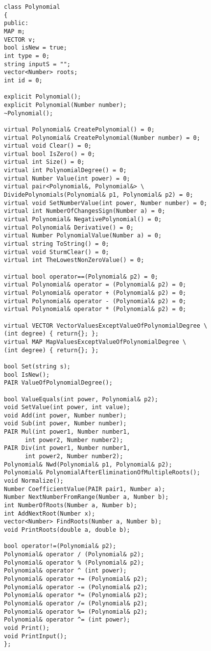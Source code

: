 \begin{lstlisting}
class Polynomial
{
public:
MAP m;
VECTOR v;
bool isNew = true;
int type = 0;
string inputS = "";
vector<Number> roots;
int id = 0;

explicit Polynomial();
explicit Polynomial(Number number);
~Polynomial();

virtual Polynomial& CreatePolynomial() = 0;
virtual Polynomial& CreatePolynomial(Number number) = 0;
virtual void Clear() = 0;
virtual bool IsZero() = 0;
virtual int Size() = 0;
virtual int PolynomialDegree() = 0;
virtual Number Value(int power) = 0;
virtual pair<Polynomial&, Polynomial&> \
DividePolynomials(Polynomial& p1, Polynomial& p2) = 0;
virtual void SetNumberValue(int power, Number number) = 0;
virtual int NumberOfChangesSign(Number a) = 0;
virtual Polynomial& NegativePolynomial() = 0;
virtual Polynomial& Derivative() = 0;
virtual Number PolynomialValue(Number a) = 0;
virtual string ToString() = 0;
virtual void SturmClear() = 0;
virtual int TheLowestNonZeroValue() = 0;

virtual bool operator==(Polynomial& p2) = 0;
virtual Polynomial& operator = (Polynomial& p2) = 0;
virtual Polynomial& operator + (Polynomial& p2) = 0;
virtual Polynomial& operator - (Polynomial& p2) = 0;
virtual Polynomial& operator * (Polynomial& p2) = 0;

virtual VECTOR VectorValuesExceptValueOfPolynomialDegree \
(int degree) { return{}; };
virtual MAP MapValuesExceptValueOfPolynomialDegree \
(int degree) { return{}; };

bool Set(string s);
bool IsNew();
PAIR ValueOfPolynomialDegree();

bool ValueEquals(int power, Polynomial& p2);
void SetValue(int power, int value);
void Add(int power, Number number);
void Sub(int power, Number number);
PAIR Mul(int power1, Number number1, 
      int power2, Number number2);
PAIR Div(int power1, Number number1,
      int power2, Number number2);
Polynomial& Nwd(Polynomial& p1, Polynomial& p2);
Polynomial& PolynomialAfterEliminationOfMultipleRoots();
void Normalize();
Number CoefficientValue(PAIR pair1, Number a);
Number NextNumberFromRange(Number a, Number b);
int NumberOfRoots(Number a, Number b);
int AddNextRoot(Number x);
vector<Number> FindRoots(Number a, Number b);
void PrintRoots(double a, double b);

bool operator!=(Polynomial& p2);
Polynomial& operator / (Polynomial& p2);
Polynomial& operator % (Polynomial& p2);
Polynomial& operator ^ (int power);
Polynomial& operator += (Polynomial& p2);
Polynomial& operator -= (Polynomial& p2);
Polynomial& operator *= (Polynomial& p2);
Polynomial& operator /= (Polynomial& p2);
Polynomial& operator %= (Polynomial& p2);
Polynomial& operator ^= (int power);
void Print();
void PrintInput();
};
\end{lstlisting}

